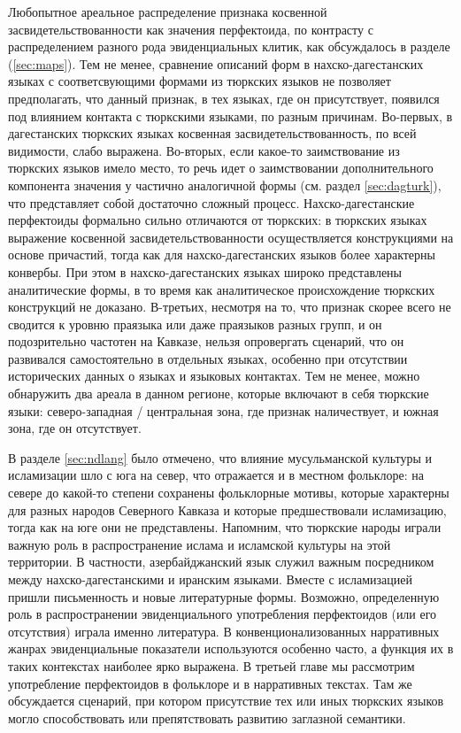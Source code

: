 \par Любопытное ареальное распределение признака косвенной засвидетельствованности как значения перфектоида, по контрасту с распределением разного рода эвиденциальных клитик, как обсуждалось в разделе (\ref{sec:maps}). Тем не менее, сравнение описаний форм в нахско-дагестанских языках с соответсвующими формами из тюркских языков не позволяет предполагать, что данный признак, в тех языках, где он присутствует, появился под влиянием контакта с тюркскими языками, по разным причинам. Во-первых, в дагестанских тюркских языках косвенная засвидетельствованность, по всей видимости, слабо выражена. Во-вторых, если какое-то заимствование из тюркских языков имело место, то речь идет о заимствовании дополнительного компонента значения у частично аналогичной формы (см. раздел \ref{sec:dagturk}), что представляет собой достаточно сложный процесс. Нахско-дагестанские перфектоиды формально сильно отличаются от тюркских: в тюркских языках выражение косвенной засвидетельствованности осуществляется конструкциями на основе причастий, тогда как для нахско-дагестанских языков более характерны конвербы. При этом в нахско-дагестанских языках широко представлены аналитические формы, в то время как аналитическое происхождение тюркских конструкций не доказано. В-третьих, несмотря на то, что признак скорее всего не сводится к уровню праязыка или даже праязыков разных групп, и он подозрительно частотен на Кавказе, нельзя опровергать сценарий, что он развивался самостоятельно в отдельных языках, особенно при отсутствии исторических данных о языках и языковых контактах. Тем не менее, можно обнаружить два ареала в данном регионе, которые включают в себя тюркские языки: северо-западная / центральная зона, где признак наличествует, и южная зона, где он отсутствует. 
\par В разделе \ref{sec:ndlang} было отмечено, что влияние мусульманской культуры и исламизации шло с юга на север, что отражается и в местном фольклоре: на севере до какой-то степени сохранены фольклорные мотивы, которые характерны для разных народов Северного Кавказа и которые предшествовали исламизацию, тогда как на юге они не представлены. Напомним, что тюркские народы играли важную роль в распространение ислама и исламской культуры на этой территории. В частности, азербайджанский язык служил важным посредником между нахско-дагестанскими и иранским языками. Вместе с исламизацией пришли письменность и новые литературные формы. Возможно, определенную роль в распространении эвиденциального употребления перфектоидов (или его отсутствия) играла именно литература. В конвенционализованных нарративных жанрах эвиденциальные показатели используются особенно часто, а функция их в таких контекстах наиболее ярко выражена. В третьей главе мы рассмотрим употребление перфектоидов в фольклоре и в нарративных текстах. Там же обсуждается сценарий, при котором присутствие тех или иных тюркских языков могло способствовать или препятствовать развитию заглазной семантики.


